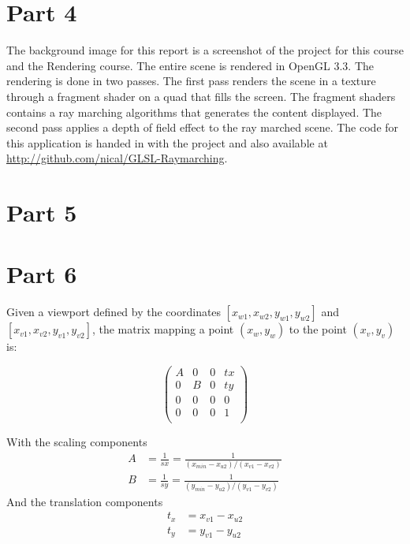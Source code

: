 


\section{Part 4}

The background image for this report is a screenshot of the project for this course and the Rendering course.
The entire scene is rendered in OpenGL 3.3. The rendering is done in two passes.
The first pass renders the scene in a texture through a fragment shader on a quad that fills the screen.
The fragment shaders contains a ray marching algorithms that generates the content displayed.
The second pass applies a depth of field effect to the ray marched scene.
The code for this application is handed in with the project and also available
at \url{http://github.com/nical/GLSL-Raymarching}.

\section{Part 5}


\section{Part 6}


Given a viewport defined by the coordinates $[x_{w1},x_{w2},y_{w1},y_{w2}]$ and $[x_{v1},x_{v2},y_{v1},y_{v2}]$,
the matrix mapping a point $(x_{w},y_{w})$ to the point $(x_{v},y_{v})$
 is:


$$
\begin{pmatrix}
    A& 0& 0& tx \\
    0& B& 0& ty \\
    0& 0& 0& 0 \\
    0& 0& 0& 1 \\
\end{pmatrix}
$$

With the scaling components\\
\begin{align*}
    A &= \frac{1}{sx} = \frac{1}{(x_{min}-x_{u2})/(x_{v1}-x_{v2})} \\
    B &= \frac{1}{sy} = \frac{1}{(y_{min}-y_{u2})/(y_{v1}-y_{v2})}
\end{align*}
And the translation components\\
\begin{align*}
   t_x &= x_{v1}-x_{u2} \\
   t_y &= y_{v1}-y_{u2} 
\end{align*}


